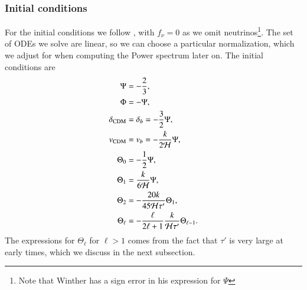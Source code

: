 \subsubsection{Initial conditions} \label{sssec:M3:theory:initial_conditions}
For the initial conditions we follow \cite{winther}, with $f_\nu=0$ as we omit neutrinos\footnote{Note that Winther has a sign error in his expression for $\Psi$}. The set of ODEs we solve are linear, so we can choose a particular normalization, which we adjust for when computing the Power spectrum later on. The initial conditions are      
\begin{subequations} \label{eq:M3:theory:pert_ODE_IC}
    \begin{align}
        \Psi &= -\frac{2}{3}, \label{eq:M3:theory:pert_ODE_IC_Psi} \\
        \Phi &= - \Psi, \label{eq:M3:theory:pert_ODE_IC_Phi} \\
        \delta_\mathrm{CDM} &= \delta_b = -\frac{3}{2}\Psi, \label{eq:M3:theory:pert_ODE_IC_delta_cdm} \\
        v_\mathrm{CDM} &= v_b = -\frac{k}{2\mathcal{H}} \Psi, \label{eq:M3:theory:pert_ODE_IC_v_cdm} \\
        \Theta_0 &= -\frac{1}{2}\Psi, \label{eq:M3:theory:pert_ODE_IC_Theta0} \\
        \Theta_1 &= \frac{k}{6\mathcal{H}}\Psi, \label{eq:M3:theory:pert_ODE_IC_Theta1} \\
        \Theta_2 &= - \frac{20k}{45\mathcal{H}\tau'}\Theta_1, \label{eq:M3:theory:pert_ODE_IC_Theta2} \\
        \Theta_\ell &= - \frac{\ell}{2\ell+1} \frac{k}{\mathcal{H}\tau'}\Theta_{\ell-1} \label{eq:M3:theory:pert_ODE_IC_Theta_ell}. 
    \end{align}
\end{subequations}
The expressions for $\Theta_\ell$ for $\ell>1$ comes from the fact that $\tau'$ is very large at early times, which we discuss in the next subsection.




